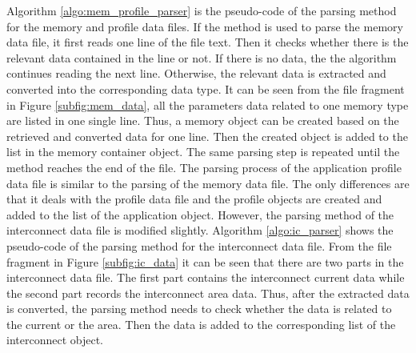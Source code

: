 	
	
	Algorithm \ref{algo:mem_profile_parser} is the pseudo-code of
	the parsing method for the memory and profile data files. If the method is
	used to parse the memory data file, it first reads one line of the file text.
	Then it checks whether there is the relevant data contained in the line or not.
	If there is no data, the the algorithm continues reading the next line.
	Otherwise, the relevant data is extracted and converted into the corresponding
	data type.
	It can be seen from the file fragment in Figure \ref{subfig:mem_data}, all the
	parameters data related to one memory type are listed in one single line.
	Thus, a memory object can be created based on the retrieved and converted data
	for one line. Then the created object is added to the list in the memory container
	object. The same parsing step is repeated until the method reaches the end of
	the file. The parsing process of the application profile data file is similar
	to the parsing of the memory data file.
	The only differences are that it deals with the profile data file and the
	profile objects are created and added to the list of the application object.
	However, the parsing method of the interconnect data file is modified slightly.
	Algorithm \ref{algo:ic_parser} shows the pseudo-code of the parsing method for
	the interconnect data file.
	From the file fragment in Figure \ref{subfig:ic_data} it can be seen that there
	are two parts in the interconnect data file.
	The first part contains the interconnect current data while the second part
	records the interconnect area data. Thus, after the extracted data is converted,
	the parsing method needs to check whether the data is related to the current or
	the area. Then the data is added to the corresponding list of the interconnect
	object.
	
	
	
